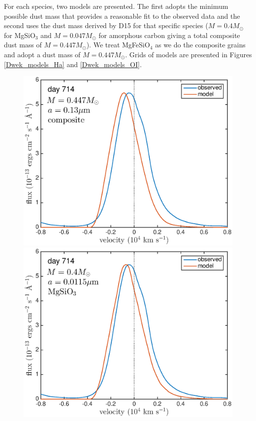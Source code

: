 \documentclass[useAMS,usenatbib,usegraphicx]{mnras}
\begin{document}
For each species, two models are presented.  The first adopts the minimum possible dust mass that provides a reasonable fit to the observed data and the second uses the dust mass derived by D15 for that specific species ($M=0.4M_{\odot}$ for MgSiO$_3$ and $M=0.047M_{\odot}$ for amorphous carbon giving a total composite dust mass of $M=0.447M_{\odot}$).  We treat MgFeSiO$_4$ as we do the composite grains and adopt a dust mass of  $M=0.447M_{\odot}$.  Grids of models are presented in Figures \ref{Dwek_models_Ha} and \ref{Dwek_models_OI}.

\begin{figure}
\includegraphics[trim =0 20 0 0,clip=true,scale=0.26]{silicates_take2/composite_Dwek_Ha}
\includegraphics[trim =24 20 0 0,clip=true,scale=0.26]{silicates_take2/MgSiO3_Dwek_Ha}

\end{figure}
\end{document}
